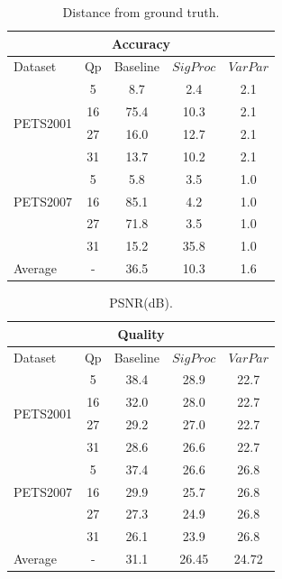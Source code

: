 \documentclass{article}
\begin{document}
\begin{table}
\centering
\begin{tabular}{|l|c|c|c|c|}
\hline
\multicolumn{5}{|c|}{Accuracy} \\
\hline
Dataset & Qp & Baseline & $SigProc$  & $VarPar$\\ 
\hline
\multirow{4}{*}{PETS2001} 
	&5  & 8.7 	&   2.4 &   2.1 \\
	&16 & 75.4 &  10.3 &   2.1\\
	&27 &16.0 	&  12.7 &   2.1\\
	&31 &13.7 &  10.2 &   2.1\\
\hline
\multirow{3}{*}{PETS2007} 
	&5 &5.8 &   3.5 &   1.0\\
	&16 &85.1 &   4.2 &   1.0\\
	&27 &71.8 &   3.5 &   1.0\\
	&31 &15.2 &  35.8 &   1.0\\
\hline
\multirow{1}{*}{Average}
& - & 36.5 & 10.3 & 1.6 \\  
\hline
\end{tabular}
\caption{Distance from ground truth.}
\label{tab:Accuracy}
\end{table}

\begin{table}
\centering
\begin{tabular}{|l|c|c|c|c|}
\hline
\multicolumn{5}{|c|}{Quality} \\
\hline
Dataset & Qp & Baseline & $SigProc$  & $VarPar$\\ 
\hline
\multirow{4}{*}{PETS2001} 
	&5 &38.4 &  28.9 &  22.7\\
	&16 &32.0 &  28.0 &  22.7\\
	&27 &29.2 &  27.0 &  22.7\\
	&31 &28.6 &  26.6 &  22.7\\
\hline
\multirow{3}{*}{PETS2007} 
	&5 &37.4 &  26.6 &  26.8\\
	&16 &29.9 &  25.7 &  26.8\\	
	&27 &27.3 &  24.9 &  26.8\\
	&31 &26.1 &  23.9 &  26.8\\
\hline
\multirow{1}{*}{Average}
& - & 31.1 & 26.45 & 24.72 \\ 
\hline
\end{tabular}
\caption{PSNR(dB).}
\label{tab:Quality}
\end{table}
\end{document}
